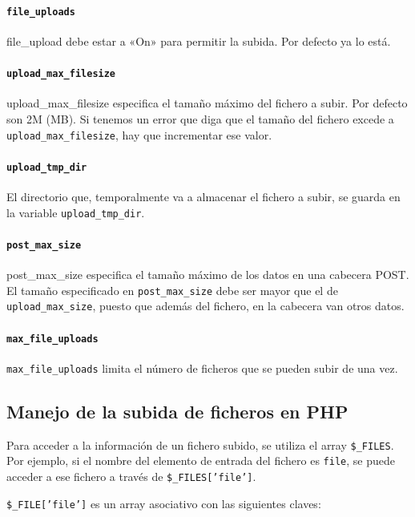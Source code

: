 \documentclass[11pt]{article}
\begin{document}
\paragraph*{\texttt{file\_uploads}}
\label{sec:org5e8268c}
file\_upload debe estar a «On» para permitir la subida. Por defecto ya lo está.

\paragraph*{\texttt{upload\_max\_filesize}}
\label{sec:orgc0c43e1}
upload\_max\_filesize especifica el tamaño máximo del fichero a
subir. Por defecto son 2M (MB). Si tenemos un error que diga que el
tamaño del fichero excede a \texttt{upload\_max\_filesize}, hay que
incrementar ese valor.

\paragraph*{\texttt{upload\_tmp\_dir}}
\label{sec:org31cdc32}
El directorio que, temporalmente va a almacenar el fichero a subir, se
guarda en la variable  \texttt{upload\_tmp\_dir}.

\paragraph*{\texttt{post\_max\_size}}
\label{sec:org4cef853}
post\_max\_size especifica el tamaño máximo de los datos en una cabecera
POST.  El tamaño especificado en \texttt{post\_max\_size} debe ser mayor que el
de \texttt{upload\_max\_size}, puesto que además del fichero, en la cabecera
van otros datos.

\paragraph*{\texttt{max\_file\_uploads}}
\label{sec:org032242a}
\texttt{max\_file\_uploads} limita el número de ficheros que se pueden subir de una vez.

\subsection{Manejo de la subida de ficheros en PHP}
\label{sec:org9630369}
Para acceder a la información de un fichero subido, se utiliza el array
\texttt{\$\_FILES}. Por ejemplo, si el nombre del elemento de entrada del
fichero es \texttt{file}, se puede acceder a ese fichero a través de \texttt{\$\_FILES['file']}.

\texttt{\$\_FILE['file']} es un array asociativo con las siguientes claves:
\end{document}
